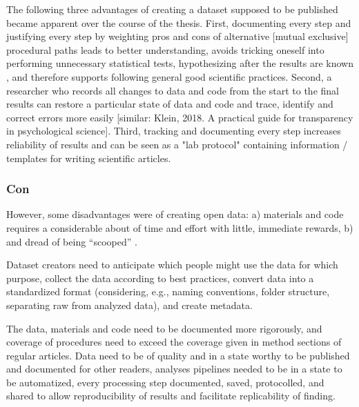 The following three advantages of creating a dataset supposed to be published
became apparent over the course of the thesis.
%
First, documenting every step and justifying every step by weighting pros and
cons of alternative [mutual exclusive] procedural paths leads to better
understanding, avoids tricking oneself into performing unnecessary statistical
tests, hypothesizing after the results are known \citep[a.k.a. ``HARKing'';
cf.][]{kerr1998harking}, and therefore supports following general good
scientific practices.
%
Second, a researcher who records all changes to data and code from the start to
the final results can restore a particular state of data and code and trace,
identify and correct errors more easily [similar: Klein, 2018. A practical guide
for transparency in psychological science].
%
Third, tracking and documenting every step increases reliability of results and
can be seen as a "lab protocol" containing information / templates for writing
scientific articles.


\subsubsection{Con}
%
However, some disadvantages were of creating open data:
%
a) materials and code requires a considerable about of time and effort with
little, immediate rewards, b) and dread of being ``scooped''
\citep[cf.][]{laine2017afraid}.

%
Dataset creators need to anticipate which people might use the data for which
purpose, collect the data according to best practices, convert data into a
standardized format (considering, e.g., naming conventions, folder structure,
separating raw from analyzed data), and create metadata.

The data, materials and code need to be documented more rigorously, and coverage
of procedures need to exceed the coverage given in method sections of regular
articles.
%
Data need to be of quality and in a state worthy to be published and documented
for other readers, analyses pipelines needed to be in a state to be automatized,
every processing step documented, saved, protocolled, and shared to allow
reproducibility of results and facilitate replicability of finding.

